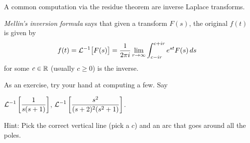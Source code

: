 \documentclass[10pt,aspectratio=169]{beamer}
\begin{document}
\begin{frame}

A common computation via the residue theorem are
inverse Laplace transforms.

\emph{Mellin's inversion formula} says that given a transform $F(s)$,
the original $f(t)$ is given by
\begin{equation*}
f(t) = {\mathcal{L}}^{-1}\bigl[F(s)\bigr] =
\frac{1}{2 \pi i }
\lim_{r \to \infty}
\int_{c-ir}^{c+ir}
e^{st}F(s) \, ds
\end{equation*}
for some $c \in {\mathbb{R}}$ (usually $c \geq 0$) is the inverse.

\medskip
\pause

As an exercise, try your hand at computing a few.  Say

\medskip

\qquad$\displaystyle {\mathcal{L}}^{-1}\left[ \frac{1}{s(s+1)} \right]$,
\qquad {} \qquad
$\displaystyle {\mathcal{L}}^{-1}\left[ \frac{s^2}{(s+2)^2(s^2+1)} \right]$.

\medskip
\pause
Hint: Pick the correct vertical line (pick a $c$) and an arc that goes
around all the poles.
\end{frame}
\end{document}

